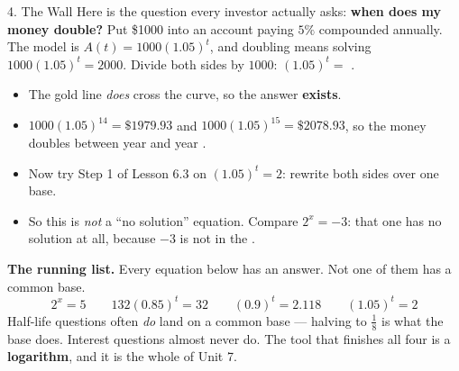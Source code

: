 \documentclass[10pt]{article}
\begin{document}
\boxguard[30]
\begin{notesbox}{4. The Wall}
Here is the question every investor actually asks: \textbf{when does my money double?} Put \$1000 into
an account paying $5\%$ compounded annually. The model is $A(t)=1000(1.05)^{t}$, and doubling means
solving $1000(1.05)^{t}=2000$. Divide both sides by $1000$: \; $(1.05)^{t}=$ \blank{1.2cm}.

\vspace{3pt}

\begin{center}
\begin{minipage}[c]{0.46\linewidth}
\centering
{}
\end{minipage}
\begin{minipage}[c]{0.50\linewidth}
\small
\begin{itemize}[leftmargin=1.3em, itemsep=2pt]
  \item The gold line \emph{does} cross the curve, so the answer \textbf{exists}.
  \item $1000(1.05)^{14}=\$1979.93$ and $1000(1.05)^{15}=\$2078.93$, so the money doubles between year
        \blank{1.0cm} and year \blank{1.0cm}.
  \item Now try Step 1 of Lesson 6.3 on $(1.05)^{t}=2$: rewrite both sides over one base.
        \blank{4.6cm}
  \item So this is \emph{not} a ``no solution'' equation. Compare $2^{x}=-3$: that one has no solution
        at all, because $-3$ is not in the \blank{2.0cm}.
\end{itemize}
\end{minipage}
\end{center}

\vspace{3pt}
\begin{tcolorbox}[colback=redbg, colframe=redacc, boxrule=0.8pt, arc=1.5mm,
    left=2.5mm, right=2.5mm, top=1.5mm, bottom=1.5mm]
\textbf{The running list.} Every equation below has an answer. Not one of them has a common base.
\[
  2^{x}=5 \qquad 132(0.85)^{t}=32 \qquad (0.9)^{t}=2.118 \qquad (1.05)^{t}=2
\]
Half-life questions often \emph{do} land on a common base --- halving to $\frac18$ is what the base
does. Interest questions almost never do. The tool that finishes all four is a \textbf{logarithm}, and
it is the whole of Unit 7.
\end{tcolorbox}
\end{notesbox}
\end{document}
